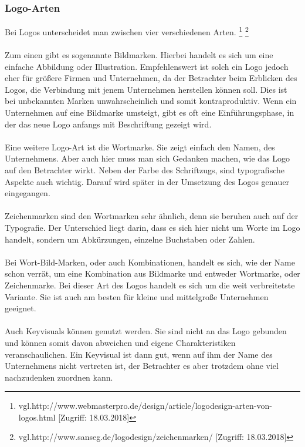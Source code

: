 \subsubsection{Logo-Arten}
Bei Logos unterscheidet man zwischen vier verschiedenen Arten. \footnote{\label{} vgl.http://www.webmasterpro.de/design/article/logodesign-arten-von-logos.html [Zugriff: 18.03.2018]} \footnote{\label{} vgl.http://www.sanseg.de/logodesign/zeichenmarken/ [Zugriff: 18.03.2018]}
\\
\\
Zum einen gibt es sogenannte Bildmarken. Hierbei handelt es sich um eine einfache Abbildung oder Illustration. Empfehlenswert ist solch ein Logo jedoch eher für größere Firmen und Unternehmen, da der Betrachter beim Erblicken des Logos, die Verbindung mit jenem Unternehmen herstellen können soll. Dies ist bei unbekannten Marken unwahrscheinlich und somit kontraproduktiv. Wenn ein Unternehmen auf eine Bildmarke umsteigt, gibt es oft eine Einführungsphase, in der das neue Logo anfangs mit Beschriftung gezeigt wird.
\\
\\
Eine weitere Logo-Art ist die Wortmarke. Sie zeigt einfach den Namen, des Unternehmens. Aber auch hier muss man sich Gedanken machen, wie das Logo auf den Betrachter wirkt. Neben der Farbe des Schriftzugs, sind typografische Aspekte auch wichtig. Darauf wird später in der Umsetzung des Logos genauer eingegangen.
\\
\\
Zeichenmarken sind den Wortmarken sehr ähnlich, denn sie beruhen auch auf der Typografie. Der Unterschied liegt darin, dass es sich hier nicht um Worte im Logo handelt, sondern um Abkürzungen, einzelne Buchstaben oder Zahlen.
\\
\\
Bei Wort-Bild-Marken, oder auch Kombinationen, handelt es sich, wie der Name schon verrät, um eine Kombination aus Bildmarke und entweder Wortmarke, oder Zeichenmarke. Bei dieser Art des Logos handelt es sich um die weit verbreitetste Variante. Sie ist auch am besten für kleine und mittelgroße Unternehmen geeignet.
\\
\\
Auch Keyvisuals können genutzt werden. Sie sind nicht an das Logo gebunden und können somit davon abweichen und eigene Charakteristiken veranschaulichen. Ein Keyvisual ist dann gut, wenn auf ihm der Name des Unternehmens nicht vertreten ist, der Betrachter es aber trotzdem ohne viel nachzudenken zuordnen kann.


